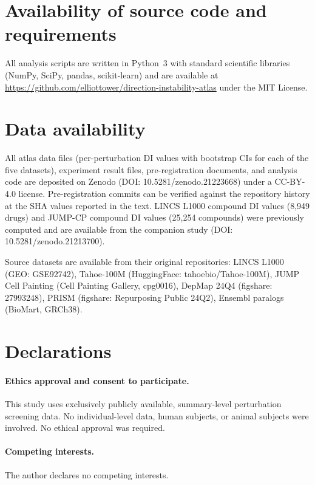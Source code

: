 \documentclass[11pt]{article}
\begin{document}

\section*{Availability of source code and requirements}

All analysis scripts are written in Python~3 with standard scientific
libraries (NumPy, SciPy, pandas, scikit-learn) and are available at
\url{https://github.com/elliottower/direction-instability-atlas} under
the MIT License.

\section*{Data availability}

All atlas data files (per-perturbation DI values with bootstrap CIs for
each of the five datasets), experiment result files, pre-registration
documents, and analysis code are deposited on Zenodo
(DOI: 10.5281/zenodo.21223668) under a CC-BY-4.0 license.
Pre-registration commits can be verified against the repository history
at the SHA values reported in the text.  LINCS L1000 compound DI values
(8{,}949 drugs) and JUMP-CP compound DI values (25{,}254 compounds)
were previously computed and are available from the companion study
(DOI: 10.5281/zenodo.21213700).

Source datasets are available from their original repositories: LINCS
L1000 (GEO: GSE92742), Tahoe-100M (HuggingFace: tahoebio/Tahoe-100M),
JUMP Cell Painting (Cell Painting Gallery, cpg0016), DepMap 24Q4
(figshare: 27993248), PRISM (figshare: Repurposing Public 24Q2),
Ensembl paralogs (BioMart, GRCh38).

\section*{Declarations}

\paragraph{Ethics approval and consent to participate.}
This study uses exclusively publicly available, summary-level perturbation screening data. No individual-level data, human subjects, or animal subjects were involved. No ethical approval was required.

\paragraph{Competing interests.}
The author declares no competing interests.
\end{document}
